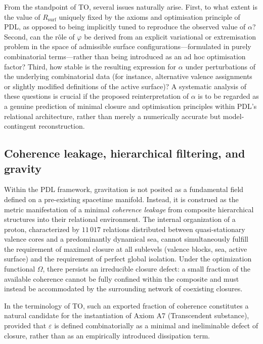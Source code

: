 \documentclass[11pt,a4paper]{article}
\begin{document}
From the standpoint of TO, several issues naturally arise. First, to what extent is the value of $R_{\text{surf}}$ uniquely fixed by the axioms and optimisation principle of PDL, as opposed to being implicitly tuned to reproduce the observed value of $\alpha$? Second, can the rôle of $\varphi$ be derived from an explicit variational or extremisation problem in the space of admissible surface configurations—formulated in purely combinatorial terms—rather than being introduced as an ad hoc optimisation factor? Third, how stable is the resulting expression for $\alpha$ under perturbations of the underlying combinatorial data (for instance, alternative valence assignments or slightly modified definitions of the active surface)? A systematic analysis of these questions is crucial if the proposed reinterpretation of $\alpha$ is to be regarded as a genuine prediction of minimal closure and optimisation principles within PDL’s relational architecture, rather than merely a numerically accurate but model-contingent reconstruction.

\subsection{Coherence leakage, hierarchical filtering, and gravity}
\label{subsec:coherence_leakage_gravity}

Within the PDL framework, gravitation is not posited as a fundamental field defined on a pre-existing spacetime manifold. Instead, it is construed as the metric manifestation of a minimal \emph{coherence leakage} from composite hierarchical structures into their relational environment. The internal organization of a proton, characterized by $11\,017$ relations distributed between quasi-stationary valence cores and a predominantly dynamical sea, cannot simultaneously fulfill the requirement of maximal closure at all sublevels (valence blocks, sea, active surface) and the requirement of perfect global isolation. Under the optimization functional $\Omega$, there persists an irreducible closure defect: a small fraction of the available coherence cannot be fully confined within the composite and must instead be accommodated by the surrounding network of coexisting closures.

In the terminology of TO, such an exported fraction of coherence constitutes a natural candidate for the instantiation of Axiom A7 (Transcendent substance), provided that $\varepsilon$ is defined combinatorially as a minimal and ineliminable defect of closure, rather than as an empirically introduced dissipation term.
\end{document}
